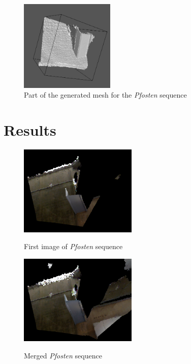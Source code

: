 \documentclass[10pt,twocolumn,letterpaper]{article}
\begin{document}
\begin{figure}
  \includegraphics[width=0.4\textwidth]{pfostenmesh}
  \caption{Part of the generated mesh for the \textit{Pfosten} sequence}
  \label{fig:pfostenmesh}
\end{figure}

\section{Results}

\begin{figure}
  \includegraphics[width=0.5\textwidth]{pfostenstart}
  \label{fig:pfostenstart}
  \caption{First image of \textit{Pfosten} sequence}
\end{figure}

\begin{figure}
  \includegraphics[width=0.5\textwidth]{pfostenend}
  \label{fig:pfostenend}
  \caption{Merged \textit{Pfosten} sequence}
\end{figure}
\end{document}
